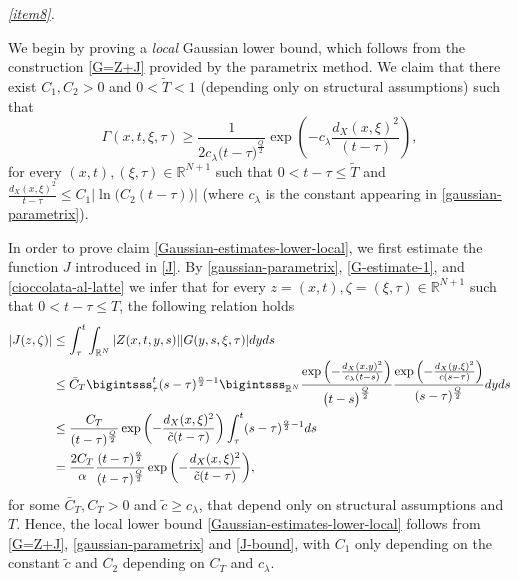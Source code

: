 \documentclass[11pt,a4paper]{article}
\numberwithin{equation}{section}
\def \rn {{\mathbb {R}}^{N}}
\def \rnn {{\mathbb {R}}^{N+1}}
\def \a {{\alpha}}
\def \G {{\Gamma}}
\def \l {{\lambda}}
\def \t {{\tau}}
\def \x {{\xi}}
\def \z {{\zeta}}
\begin{document}
\begin{pf-fundamental}
	
	\medskip\emph{\ref{item8}.}
	
	
	We begin by proving a \emph{local} Gaussian lower bound, which follows from the construction \eqref{G=Z+J} provided by the parametrix method. We claim that there exist $C_1,C_2>0$ and $0<\tilde{T}<1$ (depending only on structural assumptions) such that
	\begin{equation}\label{Gaussian-estimates-lower-local}
		\G(x,t,\x,\t) \geq	 \frac{1}{2 c_\l\big(t-\t\big)^{\frac{Q}{2}}}\exp{\left(- c_\l\frac{d_X(x,\x)^2}{(t-\t)}\right)},
	\end{equation}
	for every $(x,t),(\x,\t)\in \rnn$ such that $0<t-\t\leq \tilde T$ and $\frac{d_X(x,\x)^2}{t-\t} \leq C_1 \left|\ln\Big(C_2(t-\t)\Big)\right|$ (where $c_\l$ is the constant appearing in \eqref{gaussian-parametrix}). 
	
	
	In order to prove claim \eqref{Gaussian-estimates-lower-local}, we first estimate the function $J$ introduced in \eqref{J}. By  \eqref{gaussian-parametrix}, \eqref{G-estimate-1}, and \eqref{cioccolata-al-latte} we infer that for every $z=(x,t),\z=(\x,\t)\in \rnn$ such that $0<t-\t\leq T$, the following relation holds 
	\begin{equation}\label{J-bound}
		\begin{aligned}
			|J(z,\z)|&\leq \int_\t^t\int_{\rn} |Z(x,t,y,s)||G(y,s,\x,\t)|dyds\\
			&\leq \bar C_T \bigintsss_\t^t (s-\tau)^{\frac{\a}{2}-1}\bigintsss_{\rn}\frac{\exp{\left(-\frac{d_X(x,y)^2}{c_\l(t-s)}\right)}}{\big(t-s\big)^{\frac{Q}{2}}}\frac{\exp{\left(-\frac{d_X(y,\x)^2}{c(s-\t)}\right)}}{(s-\t)^{\frac{Q}{2}}}dyds\\
			&\leq  \frac{C_T}{(t-\t)^{\frac{Q}{2}}}\exp{\left(-\frac{d_X(x,\x)^2}{\tilde c(t-\t)}\right)}\int_\t^t (s-\tau)^{\frac{\a}{2}-1}ds\\
			&=\frac{2 C_T}{\a} \frac{(t-\t)^\frac{\a}{2}}{(t-\t)^{\frac{Q}{2}}}\exp{\left(-\frac{d_X(x,\x)^2}{\tilde c(t-\t)}\right)},
		\end{aligned}
	\end{equation}
	for some $\bar C_T,C_T> 0$ and $\tilde c\geq c_\l$, that depend only on structural assumptions and $T$. Hence, the local lower bound \eqref{Gaussian-estimates-lower-local} follows from \eqref{G=Z+J}, \eqref{gaussian-parametrix} and \eqref{J-bound}, with $C_1$ only depending on the constant $\tilde{c}$ and $C_2$ depending on $C_T$ and $c_\lambda$.
	

\end{pf-fundamental}
\end{document}
